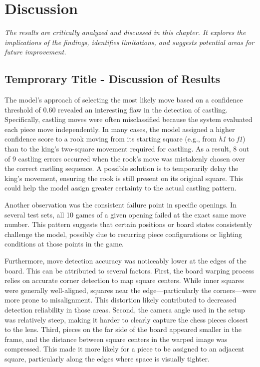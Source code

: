 \chapter{Discussion}

\begin{center}
    \textit{The results are critically analyzed and discussed in this chapter. It explores the implications of the findings, identifies limitations, and suggests potential areas for future improvement.}
\end{center}

\section{Temprorary Title - Discussion of Results}

The model’s approach of selecting the most likely move based on a confidence threshold of 0.60 revealed an interesting flaw in the detection of castling. Specifically, castling moves were often misclassified because the system evaluated each piece move independently. In many cases, the model assigned a higher confidence score to a rook moving from its starting square (e.g., from \textit{h1} to \textit{f1}) than to the king's two-square movement required for castling. As a result, 8 out of 9 castling errors occurred when the rook's move was mistakenly chosen over the correct castling sequence. A possible solution is to temporarily delay the king’s movement, ensuring the rook is still present on its original square. This could help the model assign greater certainty to the actual castling pattern.

Another observation was the consistent failure point in specific openings. In several test sets, all 10 games of a given opening failed at the exact same move number. This pattern suggests that certain positions or board states consistently challenge the model, possibly due to recurring piece configurations or lighting conditions at those points in the game.

Furthermore, move detection accuracy was noticeably lower at the edges of the board. This can be attributed to several factors. First, the board warping process relies on accurate corner detection to map square centers. While inner squares were generally well-aligned, squares near the edge—particularly the corners—were more prone to misalignment. This distortion likely contributed to decreased detection reliability in those areas. Second, the camera angle used in the setup was relatively steep, making it harder to clearly capture the chess pieces closest to the lens. Third, pieces on the far side of the board appeared smaller in the frame, and the distance between square centers in the warped image was compressed. This made it more likely for a piece to be assigned to an adjacent square, particularly along the edges where space is visually tighter.

